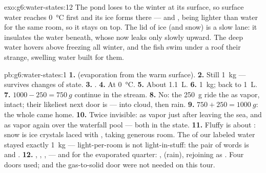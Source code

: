 \begin{solution}{exo:g6:water-states:12}
The pond loses  to the winter  at its surface, so surface
water reaches \qty{0}{\celsius} first and its ice forms there ---
and , being lighter than water for the same room, so it
stays on top. The lid of ice (and snow) is a slow lane: it
insulates the water beneath, whose  now leaks only slowly
upward. The deep water hovers above freezing all winter, and the
fish swim under a roof their strange, swelling water built for
them.
\end{solution}

\begin{solution}{pb:g6:water-states:1}
\textbf{1.}  (evaporation from the warm surface).
\textbf{2.} Still \qty{1}{kg} ---  survives changes of state.
\textbf{3.} .
\textbf{4.} At \qty{0}{\celsius}.
\textbf{5.} About \qty{1.1}{L}.
\textbf{6.}  \qty{1}{kg};  back to \qty{1}{L}.
\textbf{7.} $1000 - 250 = \qty{750}{g}$ continue in the stream.
\textbf{8.} No: the \qty{250}{g} ride the  as vapor, intact;
their likeliest next door is  --- into cloud, then
rain.
\textbf{9.} $750 + 250 = \qty{1000}{g}$: the whole  came
home.
\textbf{10.} Twice invisible: as vapor just after leaving the sea,
and as vapor again over the waterfall pool --- both in the 
state.
\textbf{11.} Fluffy is about \emph{}: snow is ice crystals
laced with , taking generous room. The \emph{} of our
labeled water stayed exactly \qty{1}{kg} --- light-per-room is not
light-in-stuff: the pair of words is  and .
\textbf{12.} , , , 
--- and for the evaporated quarter: , 
(rain), rejoining as . Four doors used;  and the
gas-to-solid door were not needed on this tour.
\end{solution}
